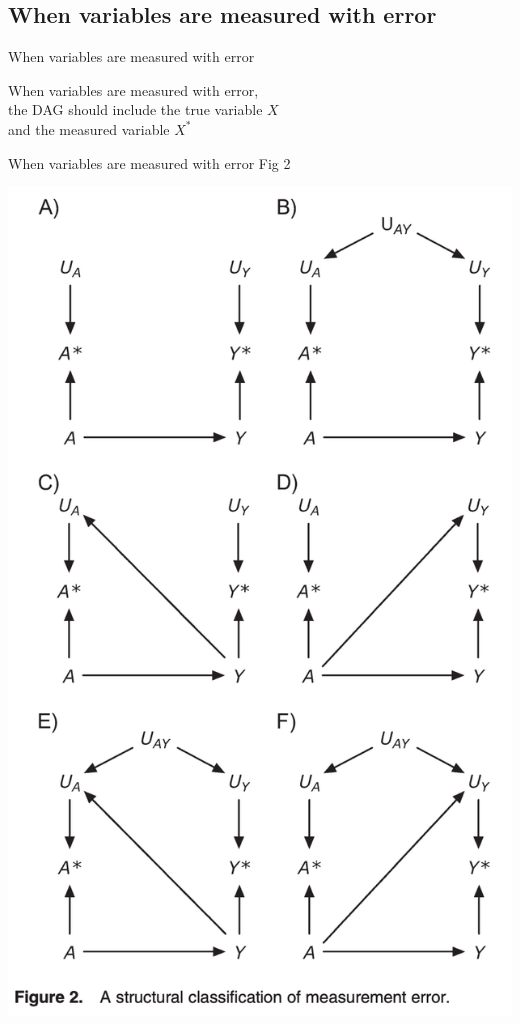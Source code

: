 \documentclass{beamer}
\newcommand\bref[2]{\href{#1}{\color{blue}{#2}}}
\begin{document}
\subsection{When variables are measured with error}

\begin{frame}{When variables are measured with error}

When variables are measured with error,\\the DAG should include the true variable $X$\\and the measured variable $X^*$

\end{frame}

\begin{frame}{When variables are measured with error}{\bref{https://doi.org/10.1093/aje/kwp293}{Hernan \& Cole (2009)} Fig 2}

\centering
\includegraphics[height = .8\textheight]{figures/hc_fig2}

\end{frame}
\end{document}

